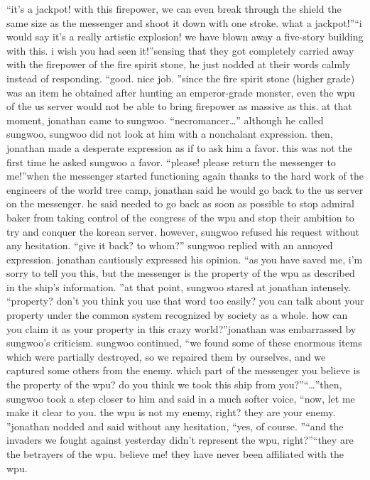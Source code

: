 “it’s a jackpot! with this firepower, we can even break through the shield the same size as the messenger and shoot it down with one stroke.
 what a jackpot!”“i would say it’s a really artistic explosion! we have blown away a five-story building with this.
 i wish you had seen it!”sensing that they got completely carried away with the firepower of the fire spirit stone, he just nodded at their words calmly instead of responding.
“good.
 nice job.
”since the fire spirit stone (higher grade) was an item he obtained after hunting an emperor-grade monster, even the wpu of the us server would not be able to bring firepower as massive as this.
at that moment, jonathan came to sungwoo.
“necromancer…”
although he called sungwoo, sungwoo did not look at him with a nonchalant expression.
then, jonathan made a desperate expression as if to ask him a favor.
this was not the first time he asked sungwoo a favor.
“please! please return the messenger to me!”when the messenger started functioning again thanks to the hard work of the engineers of the world tree camp, jonathan said he would go back to the us server on the messenger.
he said needed to go back as soon as possible to stop admiral baker from taking control of the congress of the wpu and stop their ambition to try and conquer the korean server.
however, sungwoo refused his request without any hesitation.
“give it back? to whom?” sungwoo replied with an annoyed expression.
jonathan cautiously expressed his opinion.
“as you have saved me, i’m sorry to tell you this, but the messenger is the property of the wpu as described in the ship’s information.
”at that point, sungwoo stared at jonathan intensely.
“property? don’t you think you use that word too easily? you can talk about your property under the common system recognized by society as a whole.
 how can you claim it as your property in this crazy world?”jonathan was embarrassed by sungwoo’s criticism.
sungwoo continued, “we found some of these enormous items which were partially destroyed, so we repaired them by ourselves, and we captured some others from the enemy.
 which part of the messenger you believe is the property of the wpu? do you think we took this ship from you?”“…”then, sungwoo took a step closer to him and said in a much softer voice, “now, let me make it clear to you.
 the wpu is not my enemy, right? they are your enemy.
”jonathan nodded and said without any hesitation, “yes, of course.
”“and the invaders we fought against yesterday didn’t represent the wpu, right?”“they are the betrayers of the wpu.
 believe me! they have never been affiliated with the wpu.
